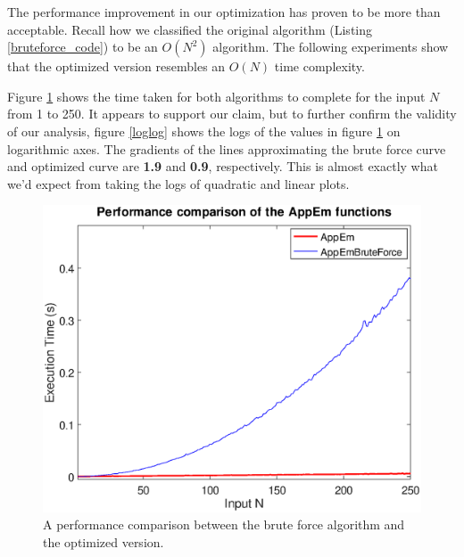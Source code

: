 \documentclass[10pt]{article}
\begin{document}
The performance improvement in our optimization has proven to be more than acceptable. Recall how we classified the original algorithm (Listing \ref{bruteforce_code}) to be an $O(N^2)$ algorithm. The following experiments show that the optimized version resembles an $O(N)$ time complexity.


Figure \ref{fig:emnaive_vs_better} shows   the time taken for both algorithms to complete for the input $N$ from 1 to 250. It appears to support our claim, but to further confirm the validity of our analysis, figure \ref{loglog} shows the logs of the values in figure \ref{fig:emnaive_vs_better} on logarithmic axes. The gradients of the lines approximating the brute force curve and optimized curve are \textbf{1.9} and \textbf{0.9}, respectively. This is almost exactly what we'd expect from taking the logs of quadratic and linear plots.

\begin{figure}[!hb]

   \includegraphics[scale=0.5]{bruteforce_vs_better.eps}

   \caption{A performance comparison between the brute force algorithm and the optimized version.}
      \label{fig:emnaive_vs_better}
\end{figure}
\end{document}
